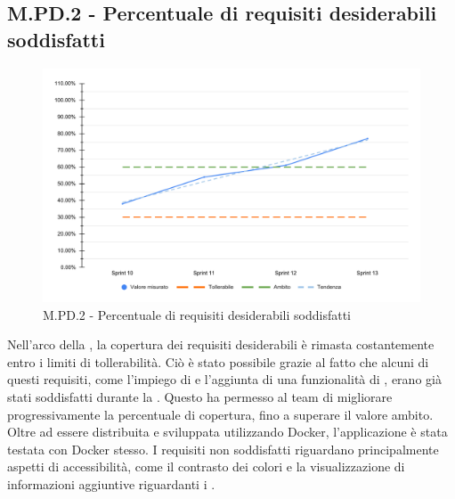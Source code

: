 \subsection{M.PD.2 - Percentuale di requisiti desiderabili soddisfatti}

\begin{figure}[H]
    \centering
    \includegraphics[width=\textwidth]{assets/requisiti_desiderabili_soddisfatti.pdf}
    \caption{M.PD.2 - Percentuale di requisiti desiderabili soddisfatti}
\end{figure}

\par Nell'arco della , la copertura dei requisiti desiderabili è rimasta costantemente entro i limiti di tollerabilità. Ciò è stato possibile grazie al fatto che alcuni di questi requisiti, come l'impiego di  e l'aggiunta di una funzionalità di , erano già stati soddisfatti durante la . Questo ha permesso al team di migliorare progressivamente la percentuale di copertura, fino a superare il valore ambito. Oltre ad essere distribuita e sviluppata utilizzando Docker, l'applicazione è stata testata con Docker stesso. I requisiti non soddisfatti riguardano principalmente aspetti di accessibilità, come il contrasto dei colori e la visualizzazione di informazioni aggiuntive riguardanti i .